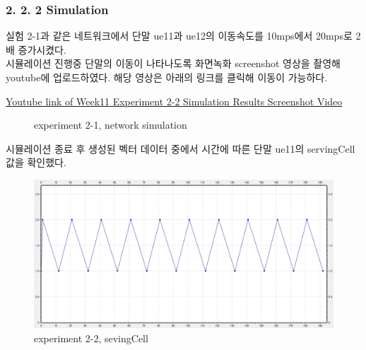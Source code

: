     \subsubsection*{2. 2. 2 Simulation}
    \vspace{-3mm}
        실험 2-1과 같은 네트워크에서 단말 ue11과 ue12의 이동속도를 10mps에서 20mps로 2배 증가시켰다. \\
        시뮬레이션 진행중 단말의 이동이 나타나도록 화면녹화 screenshot 영상을 촬영해 youtube에 업로드하였다. 해당 영상은 아래의 링크를 클릭해 이동이 가능하다.
        \vspace{-10mm}
            \begin{center}
                \item \href{https://www.youtube.com/watch?v=caP-YgTERbA&ab_channel=anamnesis}
            	{Youtube link of Week11 Experiment 2-2 Simulation Results Screenshot Video}
            \end{center}
        \vspace{-6mm}
        \begin{figure}[h!]
            \centering
            \hspace{3mm}
            \hspace{3mm}
            \caption{experiment 2-1, network simulation}
        \end{figure}
        시뮬레이션 종료 후 생성된 벡터 데이터 중에서 시간에 따른 단말 ue11의 servingCell 값을 확인했다.
        \begin{figure}[!h]\centering 
	        \includegraphics[width=.68\textwidth]{image/week11/2-2-3.png}
	        \caption{\footnotesize
	        experiment 2-2, sevingCell}
	        \vspace{-10pt}
        \end{figure}
